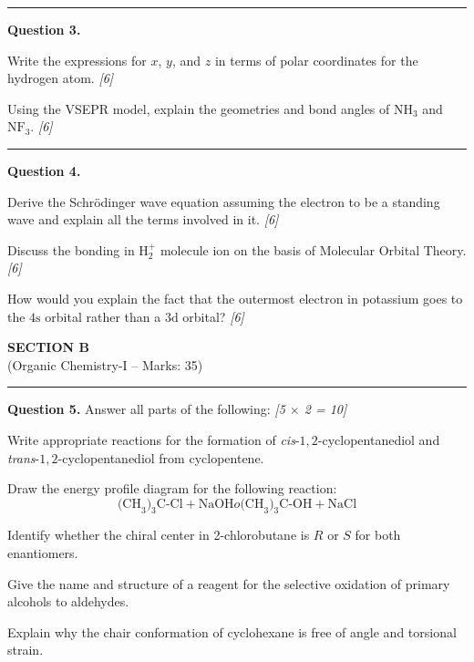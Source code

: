 \documentclass[11pt,a4paper]{article}
\newcommand{\pts}[1]{\hfill   \textit{[#1]}}
\begin{document}
\medskip\rule{\linewidth}{0.2pt}




\noindent   \textbf{Question 3.}

\begin{parts}
  \item Write the expressions for $x$, $y$, and $z$ in terms of polar coordinates for the hydrogen atom. \pts{6}
  \item Using the VSEPR model, explain the geometries and bond angles of $ \text{NH}_3$ and $ \text{NF}_3$. \pts{6}
\end{parts}

\medskip\rule{\linewidth}{0.2pt}




\noindent   \textbf{Question 4.}

\begin{parts}
  \item Derive the Schr\"odinger wave equation assuming the electron to be a standing wave and explain all the terms involved in it. \pts{6}
  \item Discuss the bonding in $ \text{H}_2^+$ molecule ion on the basis of Molecular Orbital Theory. \pts{6}
  \item How would you explain the fact that the outermost electron in potassium goes to the $4 \text{s}$ orbital rather than a $3 \text{d}$ orbital? \pts{6}
\end{parts}


\newpage

\begin{center}
  {\large\bfseries SECTION B}\\[2pt]
  {\normalsize (Organic Chemistry-I -- Marks: 35)}
\end{center}
\rule{0.4\linewidth}{0.2pt}
\smallskip




\noindent   \textbf{Question 5.} Answer all parts of the following: \pts{5 $ \times$ 2 = 10}

\begin{parts}
  \item Write appropriate reactions for the formation of   \textit{cis}-$1,2$-cyclopentanediol and   \textit{trans}-$1,2$-cyclopentanediol from cyclopentene.
  \item Draw the energy profile diagram for the following reaction:
    \[  \text{(CH}_3 \text{)}_3 \text{C-Cl} +  \text{NaOH}  o  \text{(CH}_3 \text{)}_3 \text{C-OH} +  \text{NaCl} \]
  \item Identify whether the chiral center in 2-chlorobutane is $R$ or $S$ for both enantiomers.
  \item Give the name and structure of a reagent for the selective oxidation of primary alcohols to aldehydes.
  \item Explain why the chair conformation of cyclohexane is free of angle and torsional strain.
\end{parts}
\end{document}
